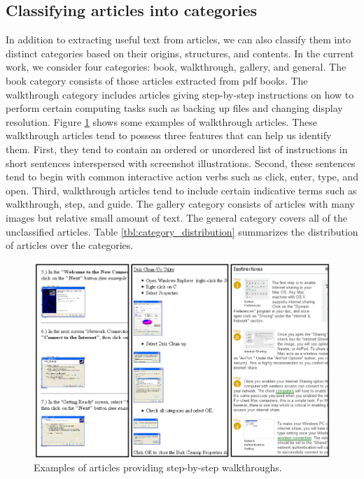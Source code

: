 \documentclass{www2010-submission}
\begin{document}
\subsection{Classifying articles into categories}

In addition to extracting useful text from articles, we can also
classify them into distinct categories based on their origins,
structures, and contents.  In the current work, we consider four
categories: book, walkthrough, gallery, and general. The book category
consists of those articles extracted from pdf books. The walkthrough
category includes articles giving step-by-step instructions on how to
perform certain computing tasks such as backing up files and changing
display resolution. Figure \ref{fig:example_walkthrough} shows some
examples of walkthrough articles. These walkthrough articles tend to
possess three features that can help us identify them. First, they
tend to contain an ordered or unordered list of instructions in short
sentences interspersed with screenshot illustrations.  Second, these
sentences tend to begin with common interactive action verbs such as
click, enter, type, and open. Third, walkthrough articles tend to
include certain indicative terms such as walkthrough,
step, and guide. The gallery category consists of articles with many
images but relative small amount of text. The general category covers
all of the unclassified articles. Table \ref{tbl:category_distribution}
summarizes the distribution of articles over the categories.

\begin{figure}
\includegraphics[width=1\columnwidth]{figure/walkthrough_examples.png}
\caption{Examples of articles providing step-by-step walkthroughs.}
\label{fig:example_walkthrough}
\end{figure}
\end{document}
